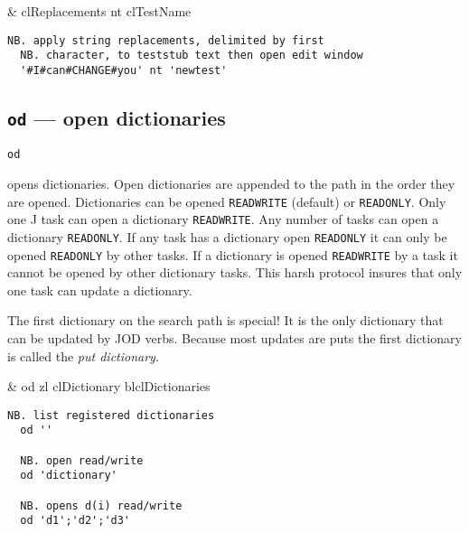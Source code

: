 \begin{wordhead}
\dyad & clReplacements nt clTestName \\
\end{wordhead}
\begin{lstlisting}[frame=single,framerule=0pt]
  NB. apply string replacements, delimited by first
  NB. character, to teststub text then open edit window
  '#I#can#CHANGE#you' nt 'newtest' 
\end{lstlisting}


\subsection{\texttt{od} --- open dictionaries}\label{ss:od}

 \hypertarget{il:od}{\texttt{od}} opens
 dictionaries. Open dictionaries are appended to the
 path in the order they are opened. Dictionaries can be opened \texttt{READWRITE}
 (default) or \texttt{READONLY}. Only one J task can open 
 a dictionary \texttt{READWRITE}.  
 Any number of tasks can open a dictionary \texttt{READONLY}. 
 If any task has a dictionary open \texttt{READONLY} it can only 
 be opened \texttt{READONLY} by other tasks. If a 
 dictionary is opened \texttt{READWRITE} by a task it 
 cannot be opened by other dictionary tasks. This harsh protocol
  insures that only one task can update a dictionary. 

The first dictionary on the search path is special!  
It is the only dictionary that can be updated by JOD verbs. 
Because most updates are puts the first dictionary is called the \emph{put dictionary}.

\begin{wordhead}
\monad & od zl \argsep clDictionary \argsep blclDictionaries \\
\end{wordhead}
\begin{lstlisting}[frame=single,framerule=0pt] 
  NB. list registered dictionaries 
  od '' 

  NB. open read/write
  od 'dictionary'   
  
  NB. opens d(i) read/write 
  od 'd1';'d2';'d3'  
\end{lstlisting}


